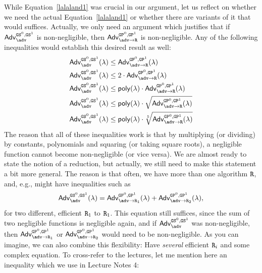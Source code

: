 While Equation~\ref{lalaland1} was crucial in our argument, let us reflect on whether we need the actual Equation~\ref{lalaland1} or whether there are variants of it that would suffices. Actually, we only need an argument which justifies that if $\mathsf{Adv}^{\M{GS}^0,\M{GS}^1}_\adv$ is non-negligible, then $\mathsf{Adv}^{\M{GP}^0,\M{GP}^1}_{\adv\rightarrow\M{R}}$ is non-negligible. Any of the following inequalities would establish this desired result as well:
\begin{align*}
      \mathsf{Adv}^{\M{GS}^0,\M{GS}^1}_\adv(\lambda) & \leq\mathsf{Adv}^{\M{GP}^0,\M{GP}^1}_{\adv\rightarrow\M{R}}(\lambda)                                  \\
      \mathsf{Adv}^{\M{GS}^0,\M{GS}^1}_\adv(\lambda) & \leq 2\cdot\mathsf{Adv}^{\M{GP}^0,\M{GP}^1}_{\adv\rightarrow\M{R}}(\lambda)                           \\
      \mathsf{Adv}^{\M{GS}^0,\M{GS}^1}_\adv(\lambda) & \leq \O{poly}(\lambda)\cdot\mathsf{Adv}^{\M{GP}^0,\M{GP}^1}_{\adv\rightarrow\M{R}}(\lambda)           \\
      \mathsf{Adv}^{\M{GS}^0,\M{GS}^1}_\adv(\lambda) & \leq \O{poly}(\lambda)\cdot\sqrt{\mathsf{Adv}^{\M{GP}^0,\M{GP}^1}_{\adv\rightarrow\M{R}}(\lambda)}    \\
      \mathsf{Adv}^{\M{GS}^0,\M{GS}^1}_\adv(\lambda) & \leq \O{poly}(\lambda)\cdot\sqrt[5]{\mathsf{Adv}^{\M{GP}^0,\M{GP}^1}_{\adv\rightarrow\M{R}}(\lambda)}
\end{align*}
The reason that all of these inequalities work is that by multiplying (or dividing) by constants, polynomials and squaring (or taking square roots), a negligible function cannot become non-negligible (or vice versa). We are almost ready to state the notion of a reduction, but actually, we still need to make this statement a bit more general. The reason is that often, we have more than one algorithm $\text{\texttt{R}}$, and, e.g., might have inequalities such as
\begin{equation}\label{lalaland12}
      \mathsf{Adv}^{\M{GS}^0,\M{GS}^1}_\adv(\lambda)=\mathsf{Adv}^{\M{GP}^0,\M{GP}^1}_{\adv\rightarrow\M{R}_1}(\lambda)+\mathsf{Adv}^{\M{GP}^0,\M{GP}^1}_{\adv\rightarrow\M{R}_2}(\lambda),
\end{equation}
for two different, efficient $\text{\texttt{R}}_1$ to $\text{\texttt{R}}_1$. This equation still suffices, since the sum of two negligible functions is negligible again, and if $\mathsf{Adv}^{\M{GS}^0,\M{GS}^1}_\adv$ was non-negligible, then $\mathsf{Adv}^{\M{GP}^0,\M{GP}^1}_{\adv\rightarrow\M{R}_1}$ or
$\mathsf{Adv}^{\M{GP}^0,\M{GP}^1}_{\adv\rightarrow\M{R}_2}$ would need to be non-negligible. As you can imagine, we can also combine this flexibility: Have \emph{several} efficient $\text{\texttt{R}}_i$ and some complex equation. To cross-refer to the lectures, let me mention here an inequality which we use in Lecture Notes 4:

